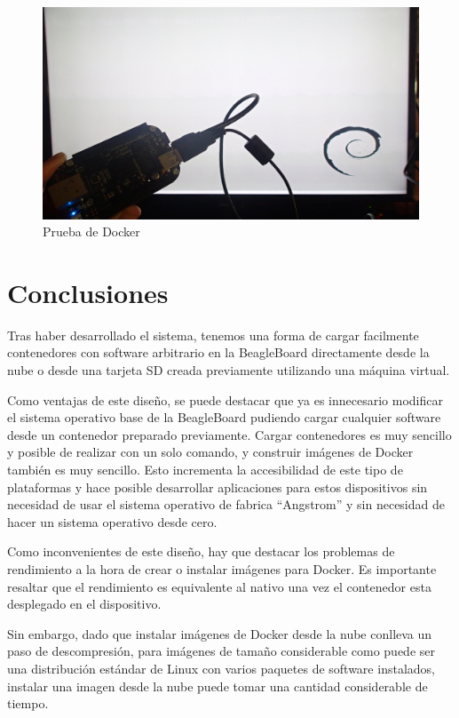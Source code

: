 \documentclass{tfg}
\begin{document}
\begin{figure}[hb]
	\centering
	\includegraphics[scale=0.4]{images/docker_test}
	\caption{Prueba de Docker}
\end{figure}


\chapter{Conclusiones}
Tras haber desarrollado el sistema, tenemos una forma de cargar facilmente contenedores con software arbitrario en la BeagleBoard directamente desde la nube o desde una tarjeta SD creada previamente utilizando una máquina virtual.

Como ventajas de este diseño, se puede destacar que ya es innecesario modificar el sistema operativo base de la BeagleBoard pudiendo cargar cualquier software desde un contenedor preparado previamente. Cargar contenedores es muy sencillo y posible de realizar con un solo comando, y construir imágenes de Docker también es muy sencillo. Esto incrementa la accesibilidad de este tipo de plataformas y hace posible desarrollar aplicaciones para estos dispositivos sin necesidad de usar el sistema operativo de fabrica ``Angstrom'' y sin necesidad de hacer un sistema operativo desde cero.

Como inconvenientes de este diseño, hay que destacar los problemas de rendimiento a la hora de crear o instalar imágenes para Docker. Es importante resaltar que el rendimiento es equivalente al nativo una vez el contenedor esta desplegado en el dispositivo.

Sin embargo, dado que instalar imágenes de Docker desde la nube conlleva un paso de descompresión, para imágenes de tamaño considerable como puede ser una distribución estándar de Linux con varios paquetes de software instalados, instalar una imagen desde la nube puede tomar una cantidad considerable de tiempo.
\end{document}
